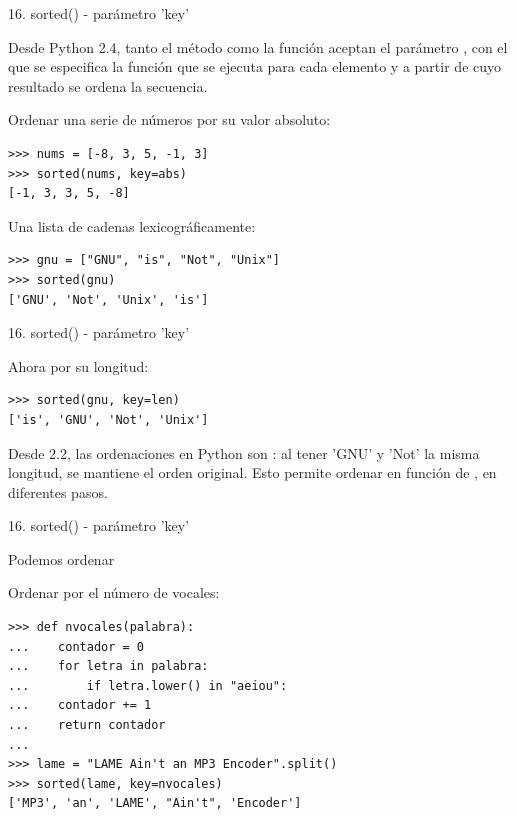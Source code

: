 \documentclass[14pt]{beamer}
\begin{document}
\begin{frame}[fragile]{16. sorted() - parámetro 'key'}
  \footnotesize
  \begin{block}{}
    \centering
    Desde Python 2.4, tanto el método  como la
    función  aceptan el parámetro ,
    con el que se especifica la función que se ejecuta para cada
    elemento y a partir de cuyo resultado se ordena la secuencia.
  \end{block}

  \begin{exampleblock}
    {Ordenar una serie de números por su valor absoluto:}
    \begin{lstlisting}
>>> nums = [-8, 3, 5, -1, 3]
>>> sorted(nums, key=abs)
[-1, 3, 3, 5, -8]
    \end{lstlisting}
  \end{exampleblock}

  \begin{exampleblock}
    {Una lista de cadenas lexicográficamente:}
    \begin{lstlisting}
>>> gnu = ["GNU", "is", "Not", "Unix"]
>>> sorted(gnu)
['GNU', 'Not', 'Unix', 'is']
    \end{lstlisting}
  \end{exampleblock}
\end{frame}

\begin{frame}[fragile]{16. sorted() - parámetro 'key'}
  \begin{exampleblock}
    {Ahora por su longitud:}
    \begin{lstlisting}
>>> sorted(gnu, key=len)
['is', 'GNU', 'Not', 'Unix']
    \end{lstlisting}
  \end{exampleblock}

  \begin{alertblock}{}
    \centering
    Desde 2.2, las ordenaciones en Python son : al
    tener 'GNU' y 'Not' la misma longitud, se mantiene el orden
    original. Esto permite ordenar en función de , en diferentes pasos.
  \end{alertblock}
\end{frame}

\begin{frame}[fragile]{16. sorted() - parámetro 'key'}
  \begin{block}{}
    \centering
    Podemos ordenar 
  \end{block}

  \footnotesize
  \begin{exampleblock}
    {Ordenar por el número de vocales:}
    \begin{lstlisting}
>>> def nvocales(palabra):
...    contador = 0
...    for letra in palabra:
...        if letra.lower() in "aeiou":
...	   contador += 1
...    return contador
...
>>> lame = "LAME Ain't an MP3 Encoder".split()
>>> sorted(lame, key=nvocales)
['MP3', 'an', 'LAME', "Ain't", 'Encoder']
    \end{lstlisting}
  \end{exampleblock}
\end{frame}
\end{document}
